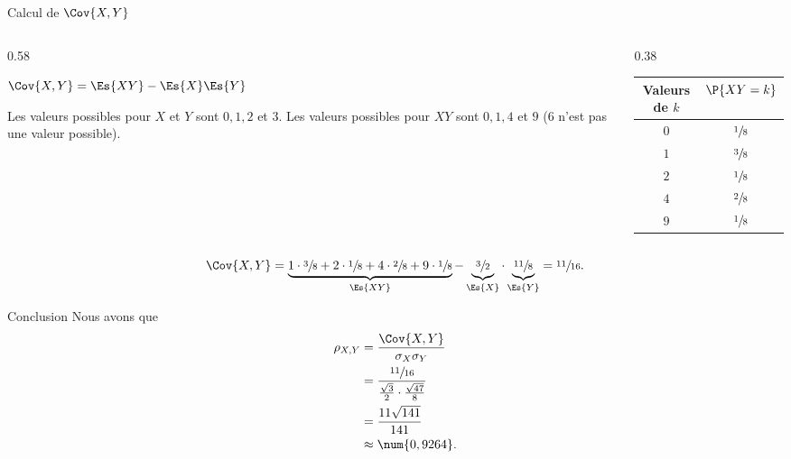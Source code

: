\documentclass[nuit,charter,pied]{BeamerJS}
\begin{document}
\begin{frame}[t]{Calcul de $\Cov{X,Y}$}
	\small
	\begin{columns}[T,onlytextwidth]
	\begin{column}{0.58\linewidth}
	\begin{lumiere}
		$\Cov{X,Y}=\Es{XY}-\Es{X}\Es{Y}$
	\end{lumiere}
	Les valeurs possibles pour $X$ et $Y$ sont $0,1,2$ et $3$. Les valeurs possibles pour $XY$ sont $0,1,4$ et $9$ ($6$ n'est pas une valeur possible).
	\end{column}
	\begin{column}{0.38\linewidth}
	\centering
	\begin{tabular}{@{}cc@{}}
		\toprule
		Valeurs de $k$ & $\P{XY=k}$     \\ \midrule
		$0$            & $\sfrac{1}{8}$ \\
		$1$            & $\sfrac{3}{8}$ \\
		$2$            & $\sfrac{1}{8}$ \\
		$4$            & $\sfrac{2}{8}$ \\ 
		$9$            & $\sfrac{1}{8}$	\\ \bottomrule
	\end{tabular}
	\end{column}
	\end{columns}
	\[\Cov{X,Y}=\underbrace{1\cdot\sfrac{3}{8}+2\cdot\sfrac{1}{8}+4\cdot\sfrac{2}{8}+9\cdot\sfrac{1}{8}}_{\Es{XY}}-\underbrace{\sfrac{3}{2}}_{\Es{X}}\cdot\underbrace{\sfrac{11}{8}}_{\Es{Y}}=\sfrac{11}{16}.\]
\end{frame}
\begin{frame}[t]{Conclusion}
	Nous avons que
	\begin{align*}
		\rho_{X,Y}&=\frac{\Cov{X,Y}}{\sigma_X\sigma_Y}\\
		&=\frac{\sfrac{11}{16}}{\frac{\sqrt{3}}{2}\cdot\frac{\sqrt{47}}{8}}\\
		&=\frac{11\sqrt{141}}{141}\\
		&\approx \num{0,9264}.
	\end{align*}
\end{frame}
\end{document}
